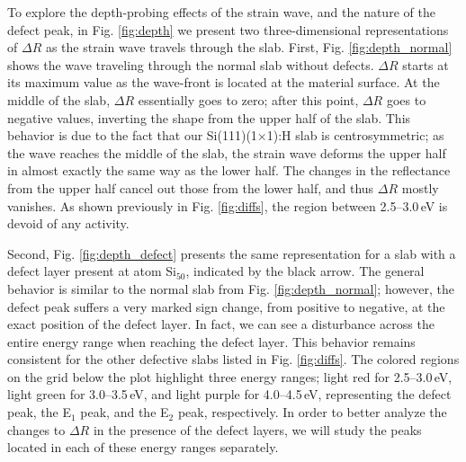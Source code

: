 \documentclass[aps,prb,10pt,showkeys,letterpaper,notitlepage,twocolumn]{revtex4-1}
\begin{document}
To explore the depth-probing effects of the strain wave, and the nature of the
defect peak, in Fig. \ref{fig:depth} we present two three-dimensional
representations of $\Delta R$ as the strain wave travels through the slab.
First, Fig. \ref{fig:depth_normal} shows the wave traveling through the normal
slab without defects. $\Delta R$ starts at its maximum value as the wave-front
is located at the material surface. At the middle of the slab, $\Delta R$
essentially goes to zero; after this point, $\Delta R$ goes to negative values,
inverting the shape from the upper half of the slab. This behavior is due to the
fact that our Si(111)(1$\times$1):H slab is centrosymmetric; as the wave reaches
the middle of the slab, the strain wave deforms the upper half in almost exactly
the same way as the lower half. The changes in the reflectance from the upper
half cancel out those from the lower half, and thus $\Delta R$ mostly vanishes.
As shown previously in Fig. \ref{fig:diffs}, the region between 2.5--3.0\,eV is
devoid of any activity.

Second, Fig. \ref{fig:depth_defect} presents the same representation for a slab
with a defect layer present at atom Si$_{50}$, indicated by the black arrow. The
general behavior is similar to the normal slab from Fig. \ref{fig:depth_normal};
however, the defect peak suffers a very marked sign change, from positive to
negative, at the exact position of the defect layer. In fact, we can see a
disturbance across the entire energy range when reaching the defect layer. This
behavior remains consistent for the other defective slabs listed in Fig.
\ref{fig:diffs}. The colored regions on the grid below the plot highlight three
energy ranges; light red for 2.5--3.0\,eV, light green for 3.0--3.5\,eV, and
light purple for 4.0--4.5\,eV, representing the defect peak, the E$_{1}$ peak,
and the E$_{2}$ peak, respectively. In order to better analyze the changes to
$\Delta R$ in the presence of the defect layers, we will study the peaks located
in each of these energy ranges separately.
\end{document}
